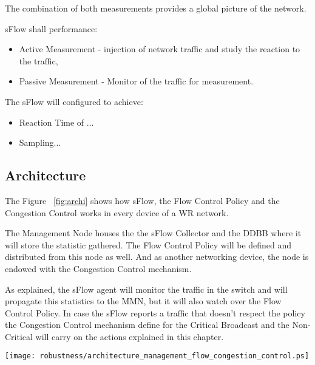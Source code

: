 \noindent The combination of both measurements provides a global picture of the
network.


\vspace{10 mm}

\noindent sFlow shall performance:

\begin{itemize}
	\item Active Measurement - injection of network traffic and study the
reaction to the traffic,
	\item Passive Measurement -  Monitor of the traffic for measurement.
\end{itemize}

\vspace{10 mm}

\noindent The sFlow will configured to achieve:
\begin{itemize}

	\item Reaction Time of ... 
	\item Sampling...
	
\end{itemize}




\subsection{Architecture}


The Figure ~\ref{fig:archi} shows how sFlow, the Flow Control Policy and the
Congestion Control works in every device of a WR network.

The Management Node houses the the sFlow Collector and the DDBB where it will
store the statistic gathered. The Flow Control Policy will be defined and
distributed from this node as well. And as another networking device, the node
is endowed with the Congestion Control mechanism.

As explained, the sFlow agent will monitor the traffic in the switch and will
propagate this statistics to the MMN, but it will also watch over the Flow
Control Policy. In case the sFlow reports a traffic that doesn't respect the
policy the Congestion Control mechanism define for the Critical Broadcast and
the Non-Critical will carry on the actions explained in this chapter.

\begin{center}

        \texttt{[image: robustness/architecture\_management\_flow\_congestion\_control.ps]}
		\label{fig:archi}
\end{center}




